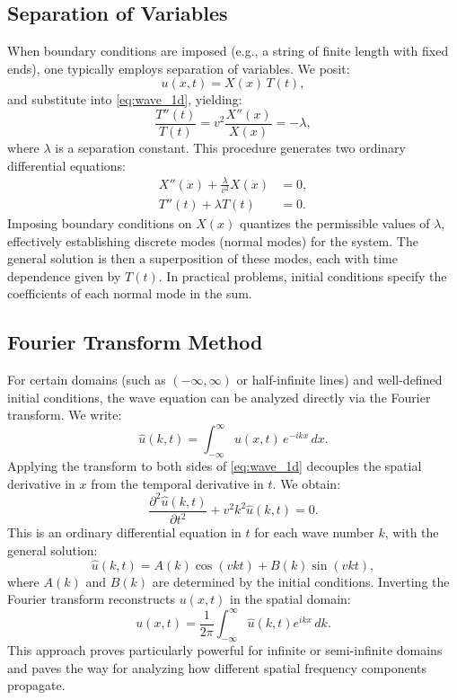 \documentclass{article}
\begin{document}
\subsection{Separation of Variables}
When boundary conditions are imposed (e.g., a string of finite length with fixed ends), one typically employs separation of variables. We posit:
\begin{equation}
    u(x,t) = X(x)\,T(t),
\end{equation}
and substitute into \eqref{eq:wave_1d}, yielding:
\begin{equation}
    \frac{T''(t)}{T(t)} = v^2 \frac{X''(x)}{X(x)} = -\lambda,
\end{equation}
where $\lambda$ is a separation constant. This procedure generates two ordinary differential equations:
\begin{align}
    X''(x) + \frac{\lambda}{v^2} X(x) &= 0, \\
    T''(t) + \lambda T(t) &= 0.
\end{align}
Imposing boundary conditions on $X(x)$ quantizes the permissible values of $\lambda$, effectively establishing discrete modes (normal modes) for the system. The general solution is then a superposition of these modes, each with time dependence given by $T(t)$. In practical problems, initial conditions specify the coefficients of each normal mode in the sum.

\subsection{Fourier Transform Method}
For certain domains (such as $(-\infty,\infty)$ or half-infinite lines) and well-defined initial conditions, the wave equation can be analyzed directly via the Fourier transform. We write:
\begin{equation}
    \hat{u}(k,t) = \int_{-\infty}^{\infty} u(x,t)\, e^{-i k x} \, dx.
\end{equation}
Applying the transform to both sides of \eqref{eq:wave_1d} decouples the spatial derivative in $x$ from the temporal derivative in $t$. We obtain:
\begin{equation}
    \frac{\partial^2 \hat{u}(k,t)}{\partial t^2} + v^2 k^2 \hat{u}(k,t) = 0.
\end{equation}
This is an ordinary differential equation in $t$ for each wave number $k$, with the general solution:
\begin{equation}
    \hat{u}(k,t) = A(k)\cos(vk t) + B(k)\sin(vk t),
\end{equation}
where $A(k)$ and $B(k)$ are determined by the initial conditions. Inverting the Fourier transform reconstructs $u(x,t)$ in the spatial domain:
\begin{equation}
    u(x,t) = \frac{1}{2\pi} \int_{-\infty}^{\infty} \hat{u}(k,t) e^{i k x} \, dk.
\end{equation}
This approach proves particularly powerful for infinite or semi-infinite domains and paves the way for analyzing how different spatial frequency components propagate.
\end{document}
